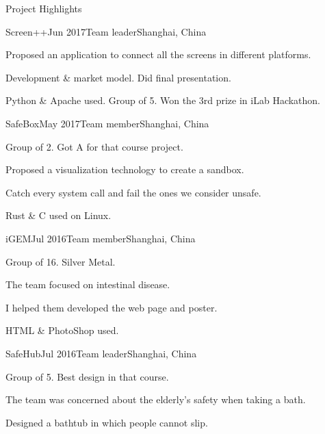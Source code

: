 \documentclass{resume} %
\begin{document}
\begin{rSection}{Project Highlights}

\begin{rSubsection}
  {Screen++}{Jun 2017}{Team leader}{Shanghai, China}
    \item Proposed an application to connect all the screens in different platforms.
    \item Development \& market model. Did final presentation.
    \item Python \& Apache used. Group of 5. Won the 3rd prize in iLab Hackathon.
\end{rSubsection}


\begin{rSubsection}
  {SafeBox}{May 2017}{Team member}{Shanghai, China}
    \item Group of 2. Got A for that course project.
    \item Proposed a visualization technology to create a sandbox.
    \item Catch every system call and fail the ones we consider unsafe.
    \item Rust \& C used on Linux.
\end{rSubsection}


\begin{rSubsection}
  {iGEM}{Jul 2016}{Team member}{Shanghai, China}
    \item Group of 16. Silver Metal.
    \item The team focused on intestinal disease.
    \item I helped them developed the web page and poster.
    \item HTML \& PhotoShop used.
\end{rSubsection}


\begin{rSubsection}
  {SafeHub}{Jul 2016}{Team leader}{Shanghai, China}
    \item Group of 5. Best design in that course.
    \item The team was concerned about the elderly's safety when taking a bath.
    \item Designed a bathtub in which people cannot slip.
\end{rSubsection}
\end{rSection}
\end{document}
